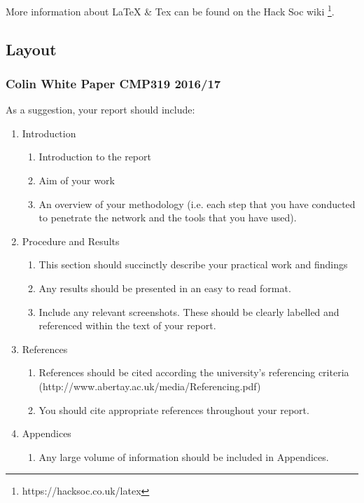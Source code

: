 \documentclass[12pt,a4paper]{article}
\begin{document}
		More information about LaTeX \& Tex can be found on the Hack Soc wiki \footnote{https://hacksoc.co.uk/latex}.
			
		\subsection{Layout}
			\subsubsection{Colin White Paper CMP319 2016/17}
				As a suggestion, your report should include:
				\begin{enumerate}
					\item{Introduction}
						\begin{enumerate}
							\item{Introduction to the report}
							\item{Aim of your work}
							\item{An overview of your methodology (i.e. each step that you have conducted to penetrate the network and the tools that you have used).}
						\end{enumerate}
					\item{Procedure and Results}
						\begin{enumerate}
							\item{This section should succinctly describe your practical work and findings}
							\item{Any results should be presented in an easy to read format.}
							\item{Include any relevant screenshots. These should be clearly labelled and referenced within the text of your report.}
						\end{enumerate}
					\item{References}
						\begin{enumerate}
							\item{References should be cited according the university's referencing criteria (http://www.abertay.ac.uk/media/Referencing.pdf)} 
							\item{You should cite appropriate references throughout your report.}
						\end{enumerate}
					\item{Appendices}
						\begin{enumerate}
							\item{Any large volume of information should be included in Appendices.}
						\end{enumerate}
				\end{enumerate}
\end{document}
